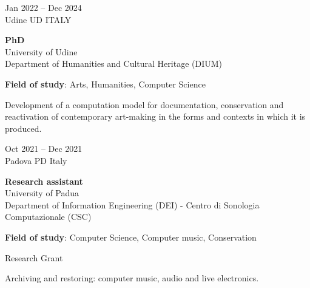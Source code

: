 \documentclass[7pt,a4paper]{article}
\begin{document}
\begin{mdframed}[
    backgroundcolor=white,
    linecolor=white,
    linewidth=0pt,
    innerleftmargin=6pt,
    innerrightmargin=6pt,
    innertopmargin=6pt,
    innerbottommargin=6pt,
    skipabove=0pt,
    skipbelow=0pt
]

\begin{minipage}[t]{0.28\textwidth}

Jan 2022 – Dec 2024
\\\scriptsize Udine UD ITALY

\end{minipage}
\begin{minipage}[t]{0.68\textwidth}
\normalsize
\textbf{PhD}\\
University of Udine
\\ \small Department of Humanities and Cultural Heritage (DIUM)
\par \vspace{0.1cm} 

\par \scriptsize \textbf{Field of study}: Arts, Humanities, Computer Science
 

\scriptsize Development of a computation model for documentation, conservation and reactivation of contemporary art-making in the forms and contexts in which it is produced.

\end{minipage}
\vspace{0.25cm}
\end{mdframed}


\begin{mdframed}[
    backgroundcolor=entrygray,
    linecolor=entrygray,
    linewidth=0pt,
    innerleftmargin=6pt,
    innerrightmargin=6pt,
    innertopmargin=6pt,
    innerbottommargin=6pt,
    skipabove=0pt,
    skipbelow=0pt
]

\begin{minipage}[t]{0.28\textwidth}

Oct 2021 – Dec 2021
\\\scriptsize Padova PD Italy

\end{minipage}
\begin{minipage}[t]{0.68\textwidth}
\normalsize
\textbf{Research assistant}\\
University of Padua
\\ \small Department of Information Engineering (DEI) - Centro di Sonologia Computazionale (CSC)
\par \vspace{0.1cm} 

\par \scriptsize \textbf{Field of study}: Computer Science, Computer music, Conservation
 

\scriptsize Research Grant

\scriptsize Archiving and restoring: computer music, audio and live electronics.

\end{minipage}
\vspace{0.25cm}
\end{mdframed}
\end{document}
